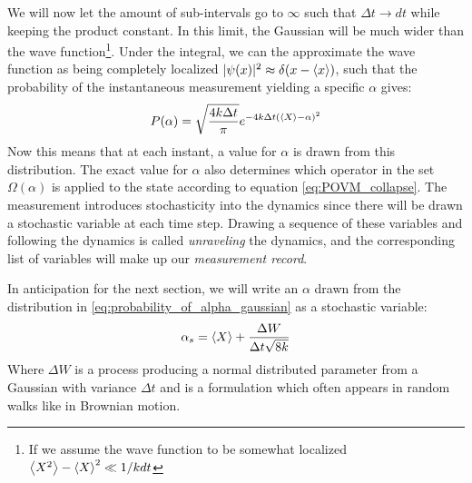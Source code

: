 We will now let the amount of sub-intervals go to $\infty$ such that $\Delta t \to dt$ while keeping the product constant. In this limit, the Gaussian will be much wider than the wave function\footnote{If we assume the wave function to be somewhat localized $\expval{X^2} - \expval{X}^2 \ll 1 / k dt$}. Under the integral, we can the approximate the wave function as being completely localized $|\psi(x)|^2 \approx \delta(x-\expval{x})$, such that the probability of the instantaneous measurement yielding a specific $\alpha$ gives:
\begin{equation}\label{eq:probability_of_alpha_gaussian}
    P(\alpha) = \sqrt{\frac{4 k \Delta t}{\pi}}  e^{-4k\Delta t (\expval{X} - \alpha)^2}
\end{equation}
Now this means that at each instant, a value for $\alpha$ is drawn from this distribution. The exact value for $\alpha$ also determines which operator in the set $\Omega(\alpha)$ is applied to the state according to equation \ref{eq:POVM_collapse}. 
The measurement introduces stochasticity into the dynamics since there will be drawn a stochastic variable at each time step. Drawing a sequence of these variables and following the dynamics is called \textit{unraveling} the dynamics, and the corresponding list of variables will make up our \textit{measurement record}. 

In anticipation for the next section, we will write an $\alpha$ drawn from the distribution in \ref{eq:probability_of_alpha_gaussian} as a stochastic variable:
\begin{equation}
    \alpha_s = \expval{X} + \frac{\Delta W}{\Delta t \sqrt{8k}}
\end{equation}
Where $\Delta W$ is a process producing a normal distributed parameter from a Gaussian with variance $\Delta t$ and is a formulation which often appears in random walks like in Brownian motion\cite{jacobs_straightforward_2006}.


